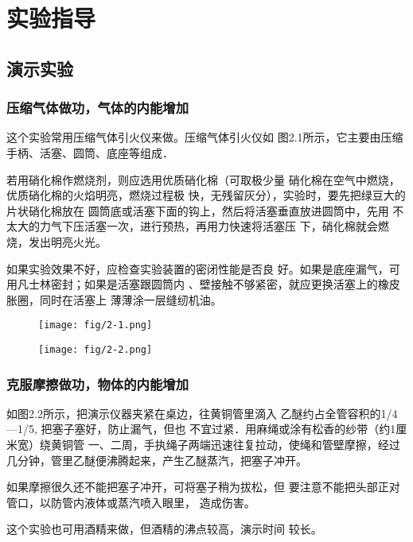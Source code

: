 \section{实验指导}
\subsection{演示实验}
\subsubsection{压缩气体做功，气体的内能增加}
这个实验常用压缩气体引火仪来做。压缩气体引火仪如
图2.1所示，它主要由压缩手柄、活塞、圆筒、底座等组成．

若用硝化棉作燃烧剂，则应选用优质硝化棉（可取极少量
硝化棉在空气中燃烧，优质硝化棉的火焰明亮，燃烧过程极
快，无残留灰分），实验时，要先把绿豆大的片状硝化棉放在
圆筒底或活塞下面的钩上，然后将活塞垂直放进圆筒中，先用
不太大的力气下压活塞一次，进行预热，再用力快速将活塞压
下，硝化棉就会燃烧，发出明亮火光。

如果实验效果不好，应检查实验装置的密闭性能是否良
好。如果是底座漏气，可用凡士林密封；如果是活塞跟圆筒内
、壁接触不够紧密，就应更换活塞上的橡皮胀圈，同时在活塞上
薄薄涂一层缝纫机油。

\begin{figure}[htp]\centering
    \begin{minipage}[t]{0.48\textwidth}
    \centering
\texttt{[image: fig/2-1.png]}
    \caption{}
    \end{minipage}
    \begin{minipage}[t]{0.48\textwidth}
    \centering
    \texttt{[image: fig/2-2.png]}
    \caption{}
    \end{minipage}
    \end{figure}

\subsubsection{克服摩擦做功，物体的内能增加}
如图2.2所示，把演示仪器夹紧在桌边，往黄铜管里滴入
乙醚约占全管容积的1/4—1/5, 把塞子塞好，防止漏气，但也
不宜过紧．用麻绳或涂有松香的纱带（约1厘米宽）绕黄铜管
一、二周，手执绳子两端迅速往复拉动，使绳和管壁摩擦，经过
几分钟，管里乙醚便沸腾起来，产生乙醚蒸汽，把塞子冲开。

如果摩擦很久还不能把塞子冲开，可将塞子稍为拔松，但
要注意不能把头部正对管口，以防管内液体或蒸汽喷入眼里，
造成伤害。

这个实验也可用酒精来做，但酒精的沸点较高，演示时间
较长。


